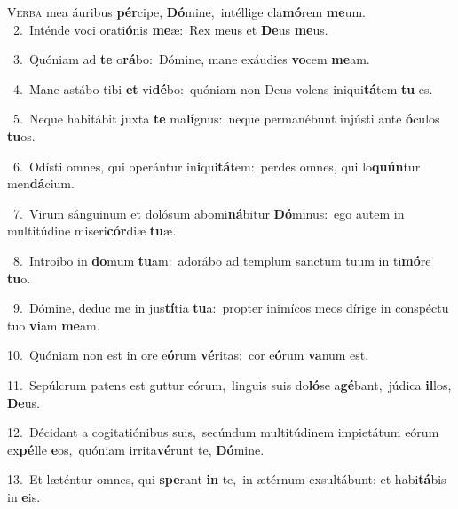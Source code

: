 \lettrine{\initial\textcolor{\initialcolor}{V}}{erba} mea áuribus \textbf{pér}\-cipe, \textbf{Dó}\-mine,~\star intéllige cla\-\textbf{mó}\-rem \textbf{me}\-um.\\
{\numbfont\textcolor{\numbcolor}{~2.}}~Inténde voci orati\-\textbf{ó}\-nis \textbf{me}\-æ:~\star Rex meus et \textbf{De}\-us \textbf{me}\-us.\par
{\numbfont\textcolor{\numbcolor}{~3.}}~Quóniam ad \textbf{te} o\-\textbf{rá}\-bo:~\star Dómine, mane exáudies \textbf{vo}\-cem \textbf{me}\-am.\par
{\numbfont\textcolor{\numbcolor}{~4.}}~Mane astábo tibi \textbf{et} vi\-\textbf{dé}\-bo:~\star quóniam non Deus volens iniqui\-\textbf{tá}\-tem \textbf{tu} es.\par
{\numbfont\textcolor{\numbcolor}{~5.}}~Neque habitábit juxta \textbf{te} ma\-\textbf{lí}\-gnus:~\star neque permanébunt injústi ante \textbf{ó}\-culos \textbf{tu}\-os.\par
{\numbfont\textcolor{\numbcolor}{~6.}}~Odísti omnes, qui operántur in\-\textbf{i}\-qui\-\textbf{tá}\-tem:~\star perdes omnes, qui lo\-\textbf{quún}\-tur men\-\textbf{dá}\-cium.\par
{\numbfont\textcolor{\numbcolor}{~7.}}~Virum sánguinum et dolósum abomi\-\textbf{ná}\-bitur \textbf{Dó}\-minus:~\star ego autem in multitúdine miseri\-\textbf{cór}\-diæ \textbf{tu}\-æ.\par
{\numbfont\textcolor{\numbcolor}{~8.}}~Introíbo in \textbf{do}\-mum \textbf{tu}\-am:~\star adorábo ad templum sanctum tuum in ti\-\textbf{mó}\-re \textbf{tu}\-o.\par
{\numbfont\textcolor{\numbcolor}{~9.}}~Dómine, deduc me in jus\-\textbf{tí}\-tia \textbf{tu}\-a:~\star propter inimícos meos dírige in conspéctu tuo \textbf{vi}\-am \textbf{me}\-am.\par
{\numbfont\textcolor{\numbcolor}{10.}}~Quóniam non est in ore e\-\textbf{ó}\-rum \textbf{vé}\-ritas:~\star cor e\-\textbf{ó}\-rum \textbf{va}\-num est.\par
{\numbfont\textcolor{\numbcolor}{11.}}~Sepúlcrum patens est guttur eórum,~\dagger linguis suis do\-\textbf{ló}\-se a\-\textbf{gé}\-bant,~\star júdica \textbf{il}\-los, \textbf{De}\-us.\par
{\numbfont\textcolor{\numbcolor}{12.}}~Décidant a cogitatiónibus suis,~\dagger secúndum multitúdinem impietátum eórum ex\-\textbf{pél}\-le \textbf{e}\-os,~\star quóniam irrita\-\textbf{vé}\-runt te, \textbf{Dó}\-mine.\par
{\numbfont\textcolor{\numbcolor}{13.}}~Et læténtur omnes, qui \textbf{spe}\-rant \textbf{in} te,~\star in ætérnum exsultábunt: et habi\-\textbf{tá}\-bis in \textbf{e}\-is.\par
